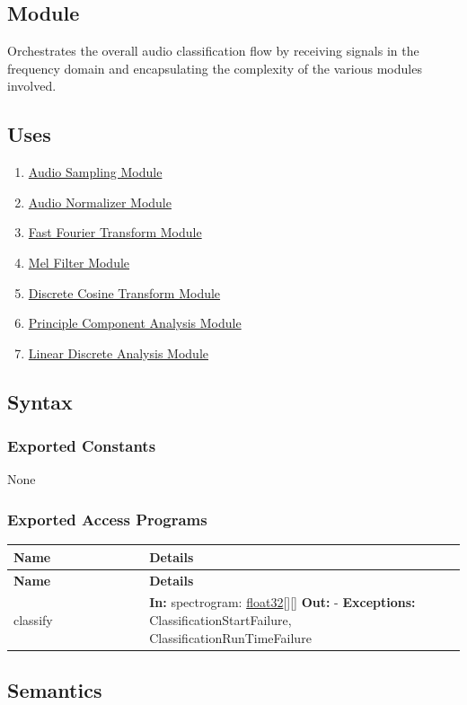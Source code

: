 \documentclass[12pt, titlepage]{article}
\newenvironment{apitable}{%
\begin{center}
\begin{longtable}{|p{0.3\linewidth}|p{0.7\linewidth}|} 
\hline
\textbf{Name} & \textbf{Details} \\
\hline
\endfirsthead
\hline
\textbf{Name} & \textbf{Details} \\
\hline
\endhead
\hline
\endfoot
\hline
\endlastfoot
}{%
\end{longtable}
\end{center}
}
\newcommand{\apifunc}[4]{%
#1 & 
\textbf{In:} #2 \newline
\textbf{Out:} #3 \newline
\textbf{Exceptions:} #4 \\
\hline
}
\begin{document}
\subsection{Module}

Orchestrates the overall audio classification flow by receiving signals in the
frequency domain and encapsulating the complexity of the various modules
involved. 

\subsection{Uses}

\begin{enumerate}
  \item \hyperref[mod:AudioSampling]{Audio Sampling Module}
  \item \hyperref[mod:AudioNormalizer]{Audio Normalizer Module}
  \item \hyperref[mod:FFT]{Fast Fourier Transform Module}
  \item \hyperref[mod:MelFilter]{Mel Filter Module}
  \item \hyperref[mod:DCT]{Discrete Cosine Transform Module}
  \item \hyperref[mod:PCA]{Principle Component Analysis Module}
  \item \hyperref[mod:LDA]{Linear Discrete Analysis Module}
\end{enumerate}

\subsection{Syntax}

\subsubsection{Exported Constants}

None

\subsubsection{Exported Access Programs}
\begin{apitable}
  \apifunc{classify}
    {spectrogram: \hyperref[generic:float32]{float32}[][]}
    {-}
    {ClassificationStartFailure, ClassificationRunTimeFailure}
\end{apitable}

\subsection{Semantics}
\end{document}
